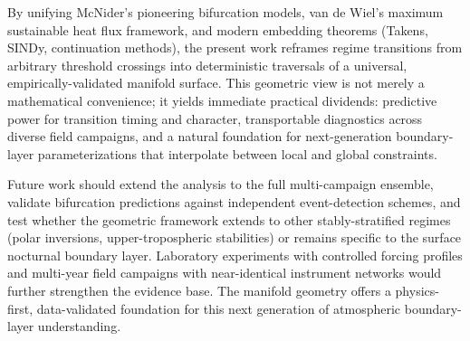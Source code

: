 \documentclass[12pt,a4paper]{article}
\begin{document}
By unifying McNider's pioneering bifurcation models, van de Wiel's maximum sustainable heat flux framework, and modern embedding theorems (Takens, SINDy, continuation methods), the present work reframes regime transitions from arbitrary threshold crossings into deterministic traversals of a universal, empirically-validated manifold surface. This geometric view is not merely a mathematical convenience; it yields immediate practical dividends: predictive power for transition timing and character, transportable diagnostics across diverse field campaigns, and a natural foundation for next-generation boundary-layer parameterizations that interpolate between local and global constraints.

Future work should extend the analysis to the full multi-campaign ensemble, validate bifurcation predictions against independent event-detection schemes, and test whether the geometric framework extends to other stably-stratified regimes (polar inversions, upper-tropospheric stabilities) or remains specific to the surface nocturnal boundary layer. Laboratory experiments with controlled forcing profiles and multi-year field campaigns with near-identical instrument networks would further strengthen the evidence base. The manifold geometry offers a physics-first, data-validated foundation for this next generation of atmospheric boundary-layer understanding.



\end{document}
